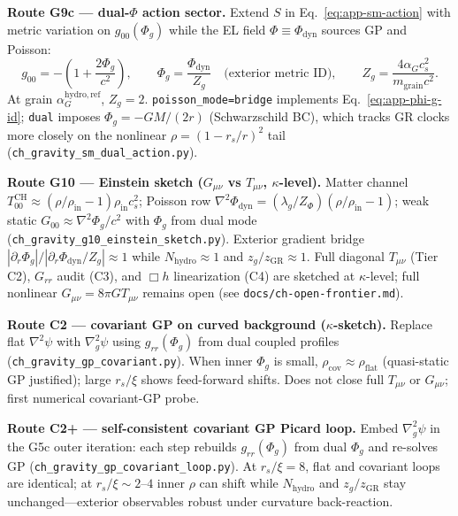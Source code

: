 \documentclass[11pt,a4paper]{article}
\begin{document}
\textbf{Route G9c --- dual-$\Phi$ action sector.}
Extend $S$ in Eq.~\ref{eq:app-sm-action} with metric variation on $g_{00}(\Phi_g)$ while the EL field $\Phi\equiv\Phi_{\mathrm{dyn}}$ sources GP and Poisson:
\begin{equation}
  g_{00} = -\left(1 + \frac{2\Phi_g}{c^2}\right),
  \qquad
  \Phi_g = \frac{\Phi_{\mathrm{dyn}}}{Z_g}\quad\text{(exterior metric ID)},
  \qquad
  Z_g = \frac{4\alpha_G c_s^2}{m_{\mathrm{grain}} c^2}.
  \label{eq:app-phi-g-id}
\end{equation}
At grain $\alpha_G^{\mathrm{hydro,ref}}$, $Z_g=2$.
\texttt{poisson\_mode=bridge} implements Eq.~\ref{eq:app-phi-g-id}; \texttt{dual} imposes $\Phi_g=-GM/(2r)$ (Schwarzschild BC), which tracks GR clocks more closely on the nonlinear $\rho=(1-r_s/r)^2$ tail (\texttt{ch\_gravity\_sm\_dual\_action.py}).

\textbf{Route G10 --- Einstein sketch ($G_{\mu\nu}$ vs $T_{\mu\nu}$, $\kappa$-level).}
Matter channel $T_{00}^{\mathrm{CH}}\approx(\rho/\rho_{\mathrm{in}}-1)\rho_{\mathrm{in}} c_s^2$; Poisson row $\nabla^2\Phi_{\mathrm{dyn}}=(\lambda_g/Z_\Phi)(\rho/\rho_{\mathrm{in}}-1)$; weak static $G_{00}\approx\nabla^2\Phi_g/c^2$ with $\Phi_g$ from dual mode (\texttt{ch\_gravity\_g10\_einstein\_sketch.py}). Exterior gradient bridge $|\partial_r\Phi_g|/|\partial_r\Phi_{\mathrm{dyn}}/Z_g|\approx 1$ while $N_{\mathrm{hydro}}\approx 1$ and $z_g/z_{\mathrm{GR}}\approx 1$. Full diagonal $T_{\mu\nu}$ (Tier C2), $G_{rr}$ audit (C3), and $\Box h$ linearization (C4) are sketched at $\kappa$-level; full nonlinear $G_{\mu\nu}=8\pi G T_{\mu\nu}$ remains open (see \texttt{docs/ch-open-frontier.md}).

\textbf{Route C2 --- covariant GP on curved background ($\kappa$-sketch).}
Replace flat $\nabla^2\psi$ with $\nabla^2_g\psi$ using $g_{rr}(\Phi_g)$ from dual coupled profiles (\texttt{ch\_gravity\_gp\_covariant.py}). When inner $\Phi_g$ is small, $\rho_{\mathrm{cov}}\approx\rho_{\mathrm{flat}}$ (quasi-static GP justified); large $r_s/\xi$ shows feed-forward shifts. Does not close full $T_{\mu\nu}$ or $G_{\mu\nu}$; first numerical covariant-GP probe.

\textbf{Route C2+ --- self-consistent covariant GP Picard loop.}
Embed $\nabla^2_g\psi$ in the G5c outer iteration: each step rebuilds $g_{rr}(\Phi_g)$ from dual $\Phi_g$ and re-solves GP (\texttt{ch\_gravity\_gp\_covariant\_loop.py}). At $r_s/\xi=8$, flat and covariant loops are identical; at $r_s/\xi\sim 2$--$4$ inner $\rho$ can shift while $N_{\mathrm{hydro}}$ and $z_g/z_{\mathrm{GR}}$ stay unchanged---exterior observables robust under curvature back-reaction.
\end{document}

